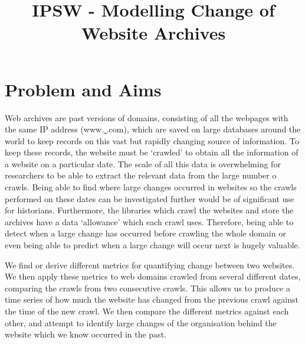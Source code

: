 \documentclass[10pt, a4paper]{article}
\begin{document}
\title{IPSW - Modelling Change of Website Archives}
\author{\vspace{-5ex}}
\date{\vspace{-5ex}}
\maketitle

\vspace{-12mm}

\section{Problem and Aims}

\vspace{-4mm}

 Web archives are past versions of domains, consisting of all the webpages with the same IP address (www.\underline{ }\underline{ }\underline{ }\underline{ }\underline{ }\underline{ }.com), which are saved on large databases around the world to keep records on this vast but rapidly changing source of information.
 To keep these records, the website must be `crawled' to obtain all the information of a website on a particular date.
 The scale of all this data is overwhelming for researchers to be able to extract the relevant data from the large number o crawls.
 Being able to find where large changes occurred in websites so the crawls performed on these dates can be investigated further would be of significant use for historians.
 Furthermore, the libraries which crawl the websites and store the archives have a data `allowance' which each crawl uses.
 Therefore, being able to detect when a large change has occurred before crawling the whole domain or even being able to predict when a large change will occur next is hugely valuable.
 
 We find or derive different metrics for quantifying change between two websites.
 We then apply these metrics to web domains crawled from several different dates, comparing the crawls from two consecutive crawls.
 This allows us to produce a time series of how much the website has changed from the previous crawl against the time of the new crawl.
 We then compare the different metrics against each other, and attempt to identify large changes of the organisation behind the website which we know occurred in the past.
\end{document}

